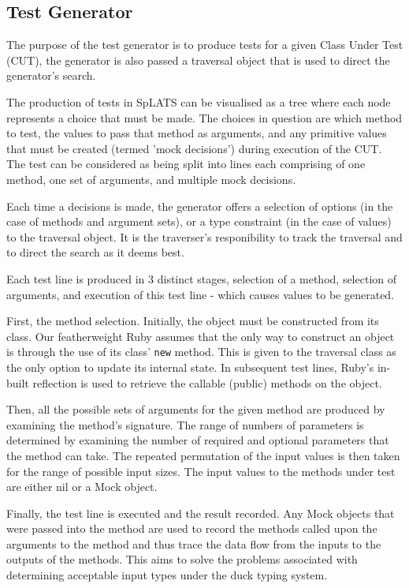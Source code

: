   \subsection{Test Generator}
    The purpose of the test generator is to produce tests for a given Class
Under Test (CUT), the generator is also passed a traversal object that is used
to direct the generator's search.

    The production of tests in SpLATS can be visualised as a tree where each
node represents a choice that must be made. The choices in question are which
method to test, the values to pass that method as arguments, and any primitive
values that must be created (termed 'mock decisions') during execution of the CUT.
    The test can be considered as being split into lines each comprising of one
method, one set of arguments, and multiple mock decisions.


    Each time a decisions is made, the generator offers a selection of options
(in the case of methods and argument sets), or a type constraint (in the case of
values) to the traversal object. It is the traverser's responibility to track
the traversal and to direct the search as it deems best.

    Each test line is produced in 3 distinct stages, selection of a method,
selection of arguments, and execution of this test line - which causes values to
be generated.

    First, the method selection. Initially, the object must be constructed from
its class. Our featherweight Ruby assumes that the only way to construct an
object is through the use of its class' \texttt{new} method. This is given to
the traversal class as the only option to update its internal state. In
subsequent test lines, Ruby's in-built reflection is used to retrieve the
callable (public) methods on the object.

    Then, all the possible sets of arguments for the given method are produced
by examining the method's signature. The range of numbers of parameters is
determined by examining the number of required and optional parameters that the
method can take. The repeated permutation of the input values is then taken
for the range of possible input sizes. The input values to the methods under
test are either nil or a Mock object.

    Finally, the test line is executed and the result recorded. Any Mock objects
that were passed into the method are used to record the methods called upon the
arguments to the method and thus trace the data flow from the inputs to the
outputs of the methods. This aims to solve the problems associated with
determining acceptable input types under the duck typing system.


